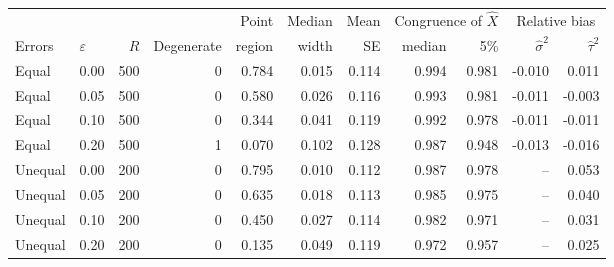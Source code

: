 \begin{tabular}{llrrrrrrrrr}
\toprule
& & & & Point & Median & Mean & \multicolumn{2}{c}{Congruence of $\widehat X$} & \multicolumn{2}{c}{Relative bias} \\
\cmidrule(lr){8-9}\cmidrule(lr){10-11}
Errors & $\varepsilon$ & $R$ & Degenerate & region & width & SE & median & 5\% & $\widehat\sigma^2$ & $\widehat\tau^2$ \\
\midrule
Equal & 0.00 & 500 & 0 & 0.784 & 0.015 & 0.114 & 0.994 & 0.981 & -0.010 & 0.011 \\
Equal & 0.05 & 500 & 0 & 0.580 & 0.026 & 0.116 & 0.993 & 0.981 & -0.011 & -0.003 \\
Equal & 0.10 & 500 & 0 & 0.344 & 0.041 & 0.119 & 0.992 & 0.978 & -0.011 & -0.011 \\
Equal & 0.20 & 500 & 1 & 0.070 & 0.102 & 0.128 & 0.987 & 0.948 & -0.013 & -0.016 \\
\midrule
Unequal & 0.00 & 200 & 0 & 0.795 & 0.010 & 0.112 & 0.987 & 0.978 & -- & 0.053 \\
Unequal & 0.05 & 200 & 0 & 0.635 & 0.018 & 0.113 & 0.985 & 0.975 & -- & 0.040 \\
Unequal & 0.10 & 200 & 0 & 0.450 & 0.027 & 0.114 & 0.982 & 0.971 & -- & 0.031 \\
Unequal & 0.20 & 200 & 0 & 0.135 & 0.049 & 0.119 & 0.972 & 0.957 & -- & 0.025 \\
\bottomrule
\end{tabular}
